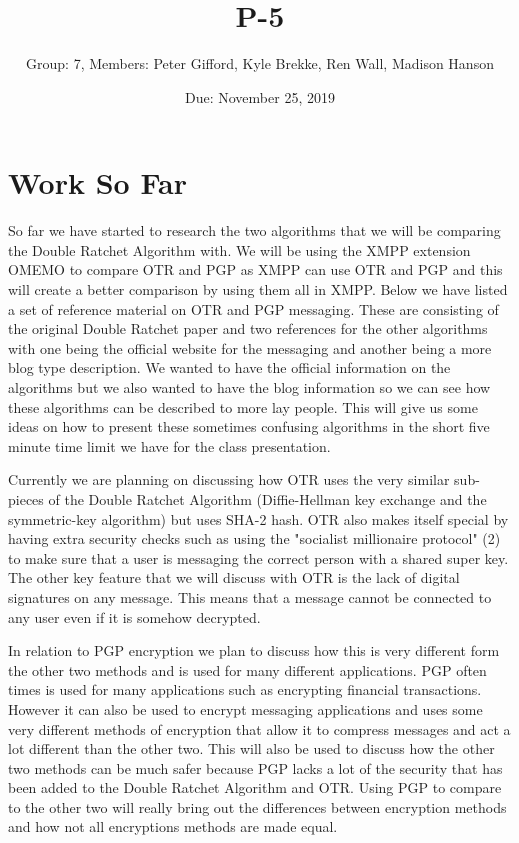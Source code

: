 \documentclass{article}
\title{P-5}
\author{Group: 7, Members: Peter Gifford, Kyle Brekke, Ren Wall, Madison Hanson}
\date{Due: November 25, 2019}
\begin{document}
\maketitle

\section{Work So Far}

So far we have started to research the two algorithms that we will be comparing the Double Ratchet Algorithm with. We will be using the XMPP extension OMEMO to compare OTR and PGP as XMPP can use OTR and PGP and this will create a better comparison by using them all in XMPP. Below we have listed a set of reference material on OTR and PGP messaging. These are consisting of the original Double Ratchet paper and two references for the other algorithms with one being the official website for the messaging and another being a more blog type description. We wanted to have the official information on the algorithms but we also wanted to have the blog information so we can see how these algorithms can be described to more lay people. This will give us some ideas on how to present these sometimes confusing algorithms in the short five minute time limit we have for the class presentation. \newline

Currently we are planning on discussing how OTR uses the very similar sub-pieces of the Double Ratchet Algorithm (Diffie-Hellman key exchange and  the symmetric-key algorithm)  but uses SHA-2 hash. OTR also makes itself special by having extra security checks such as using the "socialist millionaire protocol" (2) to make sure that a user is messaging the correct person with a shared super key. The other key feature that we will discuss with OTR is the lack of digital signatures on any message. This means that a message cannot be connected to any user even if it is somehow decrypted. \newline

In relation to PGP encryption we plan to discuss how this is very different form the other two methods and is used for many different applications. PGP often times is used for many applications such as encrypting financial transactions. However it can also be used to encrypt messaging applications and uses some very different methods of encryption that allow it to compress messages and act a lot different than the other two. This will also be used to discuss how the other two methods can be much safer because PGP lacks a lot of the security that has been added to the Double Ratchet Algorithm and OTR. Using PGP to compare to the other two will really bring out the differences between encryption methods and how not all encryptions methods are made equal.
\end{document}
